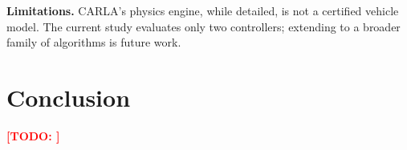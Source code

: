 \documentclass[conference]{IEEEtran}
\newcommand{\TODO}[1]{\textcolor{red}{\textbf{[TODO: #1]}}}
\begin{document}
\noindent\textbf{Limitations.}
CARLA's physics engine, while detailed, is not a certified vehicle
model. The current study evaluates only two controllers; extending to a broader family of algorithms is future work.

\section{Conclusion}\label{sec:conclusion}
\TODO{}


\end{document}
